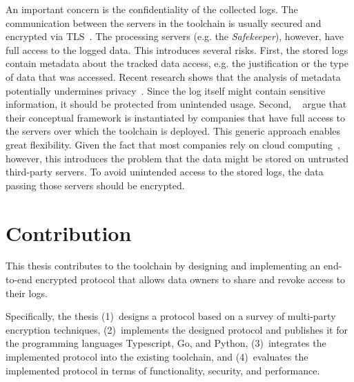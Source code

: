 \documentclass[../main.tex]{subfiles}
\begin{document}
An important concern is the confidentiality of the collected logs.
The communication between the servers in the toolchain is usually secured and encrypted via TLS~\cite{Rescorla2000}.
The processing servers (e.g. the \emph{Safekeeper}), however, have full access to the logged data.
This introduces several risks.
First, the stored logs contain metadata about the tracked data access, e.g. the justification or the type of data that was accessed.
Recent research shows that the analysis of metadata potentially undermines privacy~\cite{Greschbach2012,Mayer2016}.
Since the log itself might contain sensitive information, it should be protected from unintended usage.
Second, \citeauthor{Zieglmeier2021}~\cite{Zieglmeier2021} argue that their conceptual framework is instantiated by companies that have full access to the servers over which the toolchain is deployed.
This generic approach enables great flexibility.
Given the fact that most companies rely on cloud computing~\cite{Weber2021}, however, this introduces the problem that the data might be stored on untrusted third-party servers.
To avoid unintended access to the stored logs, the data passing those servers should be encrypted.

\section{Contribution}

This thesis contributes to the toolchain by designing and implementing an end-to-end encrypted protocol that allows data owners to share and revoke access to their logs.

Specifically, the thesis 
(1)~designs a protocol based on a survey of multi-party encryption techniques,
(2)~implements the designed protocol and publishes it for the programming languages Typescript, Go, and Python,
(3)~integrates the implemented protocol into the existing toolchain, and 
(4)~evaluates the implemented protocol in terms of functionality, security, and performance.
\end{document}
